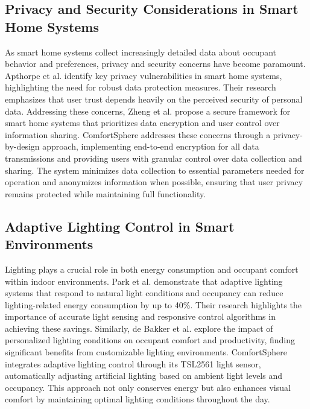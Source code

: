 \documentclass[a4paper]{scrartcl}
\begin{document}
    \subsection{Privacy and Security Considerations in Smart Home Systems}
    As smart home systems collect increasingly detailed data about occupant behavior and preferences, privacy and security concerns have become paramount. Apthorpe et al. \cite{paper17} identify key privacy vulnerabilities in smart home systems, highlighting the need for robust data protection measures. Their research emphasizes that user trust depends heavily on the perceived security of personal data. Addressing these concerns, Zheng et al. \cite{paper18} propose a secure framework for smart home systems that prioritizes data encryption and user control over information sharing. ComfortSphere addresses these concerns through a privacy-by-design approach, implementing end-to-end encryption for all data transmissions and providing users with granular control over data collection and sharing. The system minimizes data collection to essential parameters needed for operation and anonymizes information when possible, ensuring that user privacy remains protected while maintaining full functionality.

    \subsection{Adaptive Lighting Control in Smart Environments}
    Lighting plays a crucial role in both energy consumption and occupant comfort within indoor environments. Park et al. \cite{paper19} demonstrate that adaptive lighting systems that respond to natural light conditions and occupancy can reduce lighting-related energy consumption by up to 40\%. Their research highlights the importance of accurate light sensing and responsive control algorithms in achieving these savings. Similarly, de Bakker et al. \cite{paper20} explore the impact of personalized lighting conditions on occupant comfort and productivity, finding significant benefits from customizable lighting environments. ComfortSphere integrates adaptive lighting control through its TSL2561 light sensor, automatically adjusting artificial lighting based on ambient light levels and occupancy. This approach not only conserves energy but also enhances visual comfort by maintaining optimal lighting conditions throughout the day.
\end{document}
